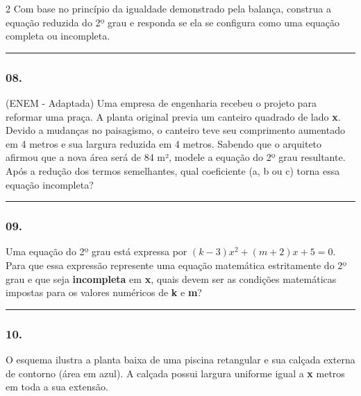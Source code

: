 \documentclass[twoside, 10pt, a4paper]{article}
\newlength{\espacoPreQuestao}\setlength{\espacoPreQuestao}{0.1cm}
\newlength{\espacoQuestao}\setlength{\espacoQuestao}{0.2cm}
\begin{document}
\begin{multicols*}{2}
Com base no princípio da igualdade demonstrado pela balança, construa a equação reduzida do 2º grau e responda se ela se configura como uma equação completa ou incompleta.
\par\vspace{\espacoQuestao}

\noindent\textcolor{CorLinha}{\rule{\linewidth}{0.5pt}} 
\par\vspace{\espacoPreQuestao}
\subsubsection*{08.} (ENEM - Adaptada) Uma empresa de engenharia recebeu o projeto para reformar uma praça. A planta original previa um canteiro quadrado de lado \textbf{x}. Devido a mudanças no paisagismo, o canteiro teve seu comprimento aumentado em 4 metros e sua largura reduzida em 4 metros. Sabendo que o arquiteto afirmou que a nova área será de 84 m², modele a equação do 2º grau resultante. Após a redução dos termos semelhantes, qual coeficiente (a, b ou c) torna essa equação incompleta?
\par\vspace{\espacoQuestao}

\noindent\textcolor{CorLinha}{\rule{\linewidth}{0.5pt}} 
\par\vspace{\espacoPreQuestao}
\subsubsection*{09.} Uma equação do 2º grau está expressa por $ (k - 3)x^2 + (m + 2)x + 5 = 0 $. Para que essa expressão represente uma equação matemática estritamente do 2º grau e que seja \textbf{incompleta} em \textbf{x}, quais devem ser as condições matemáticas impostas para os valores numéricos de \textbf{k} e \textbf{m}?
\par\vspace{\espacoQuestao}

\noindent\textcolor{CorLinha}{\rule{\linewidth}{0.5pt}} 
\par\vspace{\espacoPreQuestao}
\subsubsection*{10.} O esquema ilustra a planta baixa de uma piscina retangular e sua calçada externa de contorno (área em azul). A calçada possui largura uniforme igual a \textbf{x} metros em toda a sua extensão. 


\end{multicols*}
\end{document}
